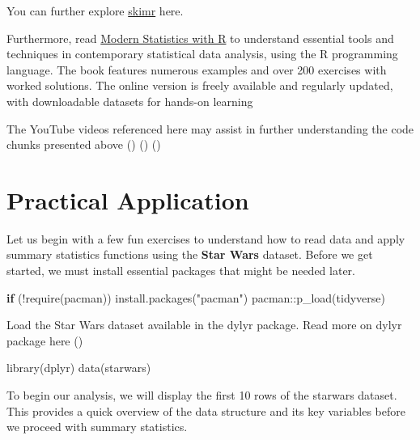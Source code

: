 \documentclass[
  man,
  floatsintext,
  longtable,
  nolmodern,
  notxfonts,
  notimes,
  colorlinks=true,linkcolor=blue,citecolor=blue,urlcolor=blue]{apa7}
\newenvironment{Shaded}{\begin{snugshade}}{\end{snugshade}}
\newcommand{\ControlFlowTok}[1]{\textcolor[rgb]{0.00,0.23,0.31}{\textbf{#1}}}
\newcommand{\FunctionTok}[1]{\textcolor[rgb]{0.28,0.35,0.67}{#1}}
\newcommand{\NormalTok}[1]{\textcolor[rgb]{0.00,0.23,0.31}{#1}}
\newcommand{\SpecialCharTok}[1]{\textcolor[rgb]{0.37,0.37,0.37}{#1}}
\newcommand{\StringTok}[1]{\textcolor[rgb]{0.13,0.47,0.30}{#1}}
\begin{document}
You can further explore \href{https://docs.ropensci.org/skimr/}{skimr}
here.

Furthermore, read
\href{https://modernstatisticswithr.com/index.html}{Modern Statistics
with R} to understand essential tools and techniques in contemporary
statistical data analysis, using the R programming language. The book
features numerous examples and over 200 exercises with worked solutions.
The online version is freely available and regularly updated, with
downloadable datasets for hands-on learning

The YouTube videos referenced here may assist in further understanding
the code chunks presented above
()
()
()

\section{Practical Application}\label{practical-application}

Let us begin with a few fun exercises to understand how to read data and
apply summary statistics functions using the \textbf{Star Wars} dataset.
Before we get started, we must install essential packages that might be
needed later.

\begin{Shaded}
\begin{Highlighting}[]
\ControlFlowTok{if}\NormalTok{ (}\SpecialCharTok{!}\FunctionTok{require}\NormalTok{(pacman)) }\FunctionTok{install.packages}\NormalTok{(}\StringTok{"pacman"}\NormalTok{)}
\NormalTok{pacman}\SpecialCharTok{::}\FunctionTok{p\_load}\NormalTok{(tidyverse)}
\end{Highlighting}
\end{Shaded}

Load the Star Wars dataset available in the dylyr package. Read more on
dylyr package here ()

\begin{Shaded}
\begin{Highlighting}[]
\FunctionTok{library}\NormalTok{(dplyr)}
\FunctionTok{data}\NormalTok{(starwars)}
\end{Highlighting}
\end{Shaded}

To begin our analysis, we will display the first 10 rows of the starwars
dataset. This provides a quick overview of the data structure and its
key variables before we proceed with summary statistics.
\end{document}
